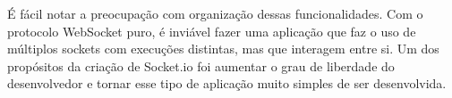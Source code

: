 \documentclass[a4paper,12pt]{article}
\begin{document}
É fácil notar a preocupação com organização dessas funcionalidades. Com o protocolo WebSocket puro, é inviável fazer uma aplicação que faz o uso de múltiplos sockets com execuções distintas, mas que interagem entre si. Um dos propósitos da criação de Socket.io foi aumentar o grau de liberdade do desenvolvedor e tornar esse tipo de aplicação muito simples de ser desenvolvida.

\newpage











\end{document}
